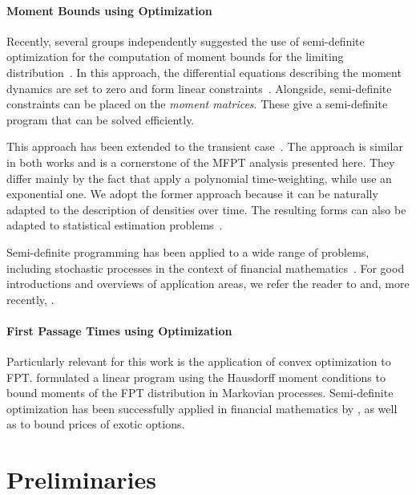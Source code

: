 \paragraph{Moment Bounds using Optimization} Recently, several groups independently suggested the use of semi-definite
optimization for the computation of moment bounds for the limiting
distribution~\cite{ghusinga2017exact,dowdy2018bounds,kuntz2017rigorous,sakurai2017convex}.
In this approach, the differential equations describing the moment dynamics are
set to zero and form linear constraints~\cite{backenkohler2018moment}. Alongside, semi-definite constraints can
be placed on the \emph{moment matrices}. These give a semi-definite program
that can be solved efficiently.

This approach has been extended to the transient
case~\cite{dowdy2018dynamic,sakurai2019bounding}.
The approach is similar in both works and is a cornerstone of the \ac{MFPT} analysis
presented here.
They differ mainly by the fact that \citet{sakurai2019bounding} apply a polynomial
time-weighting, while \citet{dowdy2018dynamic} use an
exponential one. We adopt the former approach because it
can be naturally adapted to the description of densities over time.
The resulting forms can also be adapted to statistical estimation
problems~\cite{backenkohler2019control}.

Semi-definite programming has been applied to a wide range of problems,
including stochastic processes in the context of financial
mathematics~\cite{lasserre2006pricing,kashima2009polynomial}.
For good introductions and overviews of application areas, we refer
the reader to \citet{parrilo2003semidefinite} and, more recently,
\citet{lasserre2010moments}.

\paragraph{First Passage Times using Optimization}
Particularly relevant for this work is the application of convex optimization to
\ac{FPT}.
\citet{helmes2001computing} formulated a linear program using the
Hausdorff moment conditions to bound moments of the
\ac{FPT} distribution in Markovian processes.
Semi-definite optimization has been successfully applied in financial
mathematics by \citet{kashima2009polynomial}, as well as
\citet{lasserre2006pricing} to bound prices of exotic options.

\section{Preliminaries}\label{sec:mfpt:bg}



